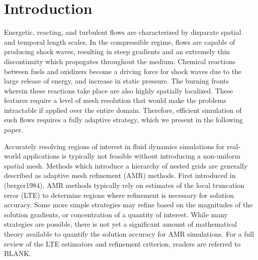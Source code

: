 \documentclass[review]{elsarticle}
\begin{document}
\linenumbers

\section{Introduction}

    Energetic, reacting, and turbulent flows are characterized by disparate
    spatial and temporal length scales. In the compressible regime, flows are
    capable of producing shock waves, resulting in steep gradients and an
    extremely thin discontinuity which propogates throughout the medium.
    Chemical reactions between fuels and oxidizers become a driving force for
    shock waves due to the large release of energy, and increase in static
    pressure. The burning fronts wherein these reactions take place are also
    highly spatially localized.  These features require a level of mesh
    resolution that would make the problems intractable if applied over the
    entire domain. Therefore, efficient simulation of such flows requires a
    fully adaptive strategy, which we present in the following paper.

    Accurately resolving regions of interest in fluid dynamics simulations for
    real-world applications is typically not feasible without introducing a
    non-uniform spatial mesh. Methods which introduce a hierarchy of nested
    grids are generally described as adaptive mesh refinement (AMR) methods.
    First introduced in (berger1984), AMR methods typically rely on estimates
    of the local truncation error (LTE) to determine regions where refinement
    is necessary for solution accuracy. Some more simple strategies may refine
    based on the magnitudes of the solution gradients, or concentration of a
    quantity of interest. While many strategies are possible, there is not yet
    a significant amount of mathematical theory available to quantify the
    solution accuracy for AMR simulations. For a full review of the LTE
    estimators and refinement criterion, readers are referred to BLANK.
\end{document}
